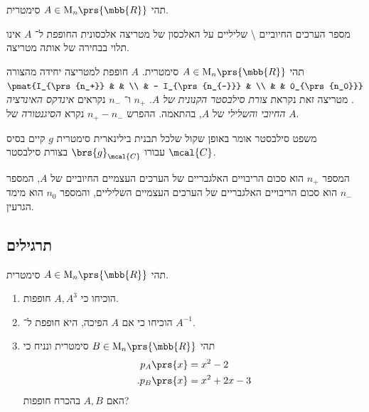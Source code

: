 \documentclass[a4paper,10pt,twoside,openany]{book}
\renewcommand{\Mat}{\mathrm{M}}
\begin{document}
\begin{theorem}[סילבסטר]
תהי
$A \in \Mat_n\prs{\mbb{R}}$
סימטרית.

מספר הערכים החיוביים%
\textbackslash%
שליליים על האלכסון של מטריצה אלכסונית החופפת ל־%
$A$
אינו תלוי בבחירה של אותה מטריצה.
\end{theorem}

\begin{corollary}
תהי
$A \in \Mat_n\prs{\mbb{R}}$
סימטרית.
$A$
חופפת למטריצה יחידה מהצורה
$\pmat{I_{\prs{n_+}} & & \\ & - I_{\prs{n_{-}}} & \\ & & 0_{\prs{n_0}}}$.
מטריצה זאת נקראת
\emph{צורת סילבסטר הקנונית של
$A$}.
$n_+$
ו־%
$n_-$
נקראים
\emph{אינדקס האינרציה החיובי והשלילי}
של
$A$,
בהתאמה.
ההפרש
$n_+ - n_-$
נקרא
\emph{הסיגנטורה}
של
$A$.
\end{corollary}

\begin{remark}
משפט סילבסטר אומר באופן שקול שלכל תבנית בילינארית סימטרית
$g$
קיים בסיס
$\mcal{C}$
עבורו
$\brs{g}_\mcal{C}$
בצורת סילבסטר.
\end{remark}

\begin{fact}
המספר
$n_+$
הוא סכום הריבויים האלגבריים של הערכים העצמיים החיוביים של
$A$,
המספר
$n_{-}$
הוא סכום הריבויים האלגבריים של הערכים העצמיים השליליים, והמספר
$n_0$
הוא מימד הגרעין.
\end{fact}

\subsection{תרגילים}

\begin{exercisechap}
תהי
$A \in \Mat_n\prs{\mbb{R}}$
סימטרית.
\begin{enumerate}
\item הוכיחו כי
$A, A^3$
חופפות.
\item הוכיחו כי אם
$A$
הפיכה, היא חופפת ל־%
$A^{-1}$.
\item תהי
$B \in \Mat_n\prs{\mbb{R}}$
סימטרית
ונניח כי
\begin{align*}
p_A\prs{x} &= x^2 - 2 \\
\text{.} p_B\prs{x} &= x^2 + 2x - 3
\end{align*}
האם
$A,B$
בהכרח חופפות?
\end{enumerate}
\end{exercisechap}
\end{document}

